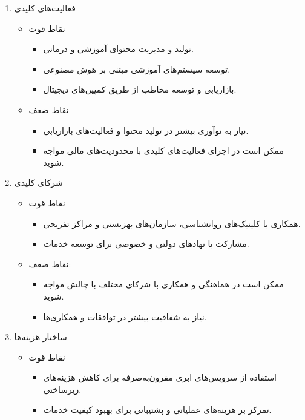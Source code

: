 \documentclass[dvipsnames, svgnames, x11names, 11pt]{article}
\begin{document}
\begin{enumerate}
\item 
فعالیت‌های کلیدی 
\begin{itemize}
\item 
نقاط قوت
\begin{itemize}
\item 
تولید و مدیریت محتوای آموزشی و درمانی.
\item 
توسعه سیستم‌های آموزشی مبتنی بر هوش مصنوعی.
\item 
بازاریابی و توسعه مخاطب از طریق کمپین‌های دیجیتال.
\end{itemize}
\item 
نقاط ضعف
\begin{itemize}
\item 
نیاز به نوآوری بیشتر در تولید محتوا و فعالیت‌های بازاریابی.
\item 
ممکن است در اجرای فعالیت‌های کلیدی با محدودیت‌های مالی مواجه شوید.
\end{itemize}
\end{itemize}

\item 
شرکای کلیدی 
\begin{itemize}
\item 
نقاط قوت
\begin{itemize}
\item 
همکاری با کلینیک‌های روانشناسی، سازمان‌های بهزیستی و مراکز تفریحی.
\item 
مشارکت با نهادهای دولتی و خصوصی برای توسعه خدمات.
\end{itemize}
\item 
نقاط ضعف:
\begin{itemize}
\item 
ممکن است در هماهنگی و همکاری با شرکای مختلف با چالش مواجه شوید.
\item 
نیاز به شفافیت بیشتر در توافقات و همکاری‌ها.
\end{itemize}
\end{itemize}

\item 
ساختار هزینه‌ها 
\begin{itemize}
\item 
نقاط قوت
\begin{itemize}
\item 
استفاده از سرویس‌های ابری مقرون‌به‌صرفه برای کاهش هزینه‌های زیرساختی.
\item 
تمرکز بر هزینه‌های عملیاتی و پشتیبانی برای بهبود کیفیت خدمات.
\end{itemize}


\end{itemize}
\end{enumerate}
\end{document}
